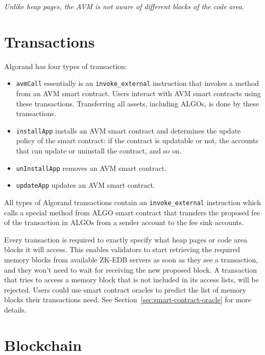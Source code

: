 \documentclass[11pt, A4]{article}
\begin{document}
    \emph{Unlike heap pages, the AVM is not aware of different blocks of the code area.}


    \section{Transactions}\label{sec:transactions}

    Algorand has four types of transaction:

    \begin{itemize}
        \item \texttt{avmCall} essentially is an \texttt{invoke\_external} instruction that invokes a method from an
        AVM smart contract. Users interact with AVM smart contracts using these transactions. Transferring all
        assets, including ALGOs, is done by these transactions.
        \item \texttt{installApp} installs an AVM smart contract and determines the update policy of the smart
        contract: if the contract is updatable or not, the accounts that can update or uninstall the contract, and so
        on.
        \item \texttt{unInstallApp} removes an AVM smart contract.
        \item \texttt{updateApp} updates an AVM smart contract.
    \end{itemize}

    All types of Algorand transactions contain an \texttt{invoke\_external} instruction which calls a special method
    from ALGO smart contract that transfers the proposed fee of the transaction in ALGOs from a sender account to the
    fee sink accounts.

    Every transaction is required to exactly specify what heap pages or code area blocks it will access. This enables
    validators to start retrieving the required memory blocks from available ZK-EDB servers as soon as they see a
    transaction, and they won't need to wait for receiving the new proposed block. A transaction that tries to access
    a memory block that is not included in its access lists, will be rejected. Users could
    use smart contract oracles to predict the list of memory blocks their transactions need. See
    Section~\ref{sec:smart-contract-oracle} for more details.


    \section{Blockchain}\label{sec:blockchain}
\end{document}
